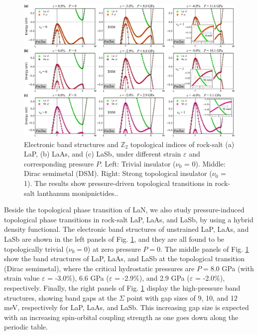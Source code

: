 	
	\begin{figure}[ht!]
		\centering
        \captionsetup{singlelinecheck = false, justification=justified}
		\includegraphics[width=\textwidth]{LaN_8.png}
		\caption[Topological phase transition driven by hydrostatic pressure in rock-salt LaP, LaAs, and LaSb]{
		Electronic band structures and $\mathbb{Z}_2$ topological indices of rock-salt (a) LaP, (b) LaAs, and (c) LaSb, under different strain $\varepsilon$ and corresponding pressure $P$. Left: Trivial insulator ($\nu_0$ = 0). Middle: Dirac semimetal (DSM). Right: Strong topological insulator ($\nu_0$ = 1). The results show pressure-driven topological transitions in rock-salt lanthanum monipnictides..
		}
		\label{fig:LaN_8}
	\end{figure}
	
	
	Beside the topological phase transition of LaN, we also study pressure-induced topological phase transitions in rock-salt LaP, LaAs, and LaSb, by using a hybrid density functional. The electronic band structures of unstrained LaP, LaAs, and LaSb are shown in the left panels of Fig. \ref{fig:LaN_8}, and they are all found to be topologically trivial ($\nu_0 = 0$) at zero pressure $P=0$. The middle panels of Fig. \ref{fig:LaN_8} show the band structures of LaP, LaAs, and LaSb at the topological transition (Dirac semimetal), where the critical hydrostatic pressures are $P = 8.0$ GPa (with strain value $\varepsilon$ = -3.0\%), 6.6 GPa ($\varepsilon$ = -2.9\%), and 2.9 GPa ($\varepsilon$ = -2.0\%), respectively. Finally, the right panels of Fig. \ref{fig:LaN_8} display the high-pressure band structures, showing band gaps at the $\Sigma$ point with gap sizes of 9, 10, and 12 meV, respectively for LaP, LaAs, and LaSb. This increasing gap size is expected with an increasing spin-orbital coupling strength as one goes down along the periodic table.


